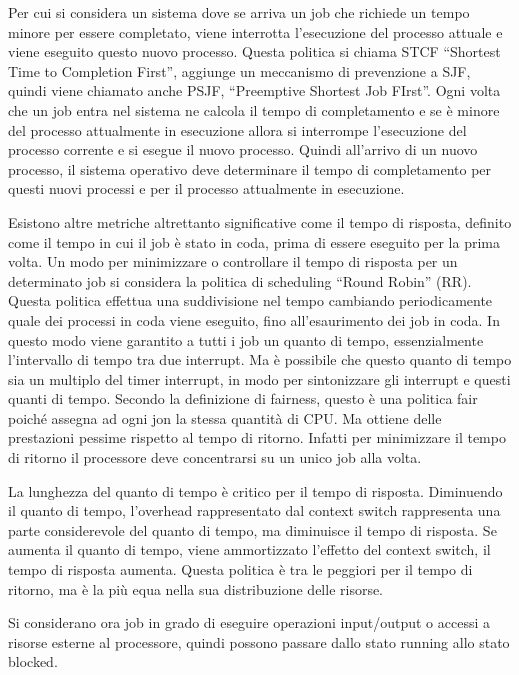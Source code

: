 \documentclass{article}
\numberwithin{equation}{subsection}
\begin{document}
Per cui si considera un sistema dove se arriva un job che richiede un tempo minore per essere completato, viene interrotta l'esecuzione del processo attuale e viene 
eseguito questo nuovo processo. Questa politica si chiama STCF ``Shortest Time to Completion First'', aggiunge un meccanismo di prevenzione a SJF, quindi viene chiamato 
anche PSJF, ``Preemptive Shortest Job FIrst''. Ogni volta che un job entra nel sistema ne calcola il tempo di completamento e se è minore del processo attualmente in 
esecuzione allora si interrompe l'esecuzione del processo corrente e si esegue il nuovo processo. Quindi all'arrivo di un nuovo processo, il sistema operativo deve 
determinare il tempo di completamento per questi nuovi processi e per il processo attualmente in esecuzione. 

Esistono altre metriche altrettanto significative come il tempo di risposta, definito come il tempo in cui il job è stato in coda, prima di essere eseguito per la prima 
volta. Un modo per minimizzare o controllare il tempo di risposta per un determinato job si considera la politica di scheduling ``Round Robin'' (RR). Questa politica effettua 
una suddivisione nel tempo cambiando periodicamente quale dei processi in coda viene eseguito, fino all'esaurimento dei job in coda. In questo modo viene garantito a 
tutti i job un quanto di tempo, essenzialmente l'intervallo di tempo tra due interrupt. Ma è possibile che questo quanto di tempo sia un multiplo del timer interrupt, in 
modo per sintonizzare gli interrupt e questi quanti di tempo. Secondo la definizione di fairness, questo è una politica fair poiché assegna ad ogni jon la stessa quantità 
di CPU. Ma ottiene delle prestazioni pessime rispetto al tempo di ritorno. 
Infatti per minimizzare il tempo di ritorno il processore deve concentrarsi su un unico job alla volta. 


La lunghezza del quanto di tempo è critico per il tempo di risposta. Diminuendo il quanto di tempo, l'overhead rappresentato dal context switch rappresenta una parte 
considerevole del quanto di tempo, ma diminuisce il tempo di risposta. Se aumenta il quanto di tempo, viene ammortizzato l'effetto del context switch, il tempo di 
risposta aumenta. 
Questa politica è tra le peggiori per il tempo di ritorno, ma è la più equa nella sua distribuzione delle risorse. 


Si considerano ora job in grado di eseguire operazioni input/output o accessi a risorse esterne al processore, quindi possono passare dallo stato running allo stato 
blocked. 

\end{document}
